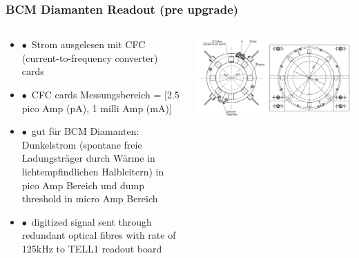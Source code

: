 \documentclass[aspectratio=1610, 12pt, xcolor=dvipsnames]{beamer}
\begin{document}
\begin{frame}\frametitle{BCM Diamanten Readout (pre upgrade)}
  \begin{columns}
    \begin{column}[c]{0.48\textwidth}
      \begin{itemize}
        \item $\bullet$\, Strom ausgelesen mit CFC (current-to-frequency converter) cards
        \item $\bullet$\, CFC cards Messungsbereich = [2.5 pico Amp (pA), 1 milli Amp (mA)]
        \item $\bullet$\, gut für BCM Diamanten: Dunkelstrom (spontane freie Ladungsträger durch Wärme in lichtempfindlichen Halbleitern) in pico Amp Bereich und dump threshold in micro Amp Bereich
        \item $\bullet$\, digitized signal sent through redundant optical fibres with rate of 125kHz to TELL1 readout board
      \end{itemize}
    \end{column}
    \begin{column}[c]{0.48\textwidth}
      \includegraphics[width=\textwidth]{plots/BCM_U_and_BCM_D.png}
    \end{column}
  \end{columns}
\end{frame}
\end{document}
